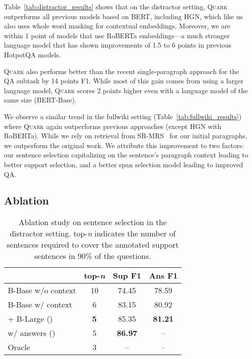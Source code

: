 \documentclass[11pt,a4paper]{article}
\newcommand\model{\textsc{Quark}\xspace}
\newcommand{\hpqa}{HotpotQA\xspace}
\newcommand\T{\rule{0pt}{2.6ex}}       \newcommand\B{\rule[-1.2ex]{0pt}{0pt}} \newcommand\R{\rule{0pt}{2.0ex}}       \newcommand{\selectmod}{\rowcolor{purple!15}}
\begin{document}
Table~\ref{tab:distractor_results} shows that on the distractor setting, \model outperforms all previous models based on BERT, including HGN, which like us also uses whole word masking for contextual embeddings. Moreover, we are within 1 point of models that use RoBERTa embeddings---a much stronger language model that has shown improvements of 1.5 to 6 points in previous \hpqa models.

\model also performs better than the recent single-paragraph approach for the QA subtask \cite{Min2019CompositionalQD} by 14 points F1. While most of this gain comes from using a larger language model, \model scores 2 points higher even with a language model of the same size (BERT-Base).

We observe a similar trend in the fullwiki setting (Table~\ref{tab:fullwiki_results}) where \model again outperforms previous approaches (except HGN with RoBERTa). While we rely on retrieval from SR-MRS~\cite{semanticmrs} for our initial paragraphs, we outperform the original work.
We attribute this improvement to two factors: our sentence selection capitalizing on the sentence's paragraph context leading to better support selection, and a better span selection model leading to improved QA.


\subsection{Ablation}

\begin{table}[t]
    \centering
    \small
    \setlength{\doublerulesep}{\arrayrulewidth}
    \begin{tabular}{l|c|c|c}
    \hline \hline
    \T                            & top-\emph{n} & Sup F1 & Ans F1 \\
    \hline
    \T B-Base w/o context         & 10 &  74.45 &  78.59 \\
    B-Base w/ context             &  6 &  83.15 &  80.92 \\
    + B-Large ()       & \textbf{5} & 85.35 & \textbf{81.21} \\
    \hline
    \T w/ answers ()      &  5 & \textbf{86.97} & -- \\
    Oracle                        &  3 & -- & -- \\
    \hline \hline
    \end{tabular}
    \caption{Ablation study on sentence selection in the distractor setting. top-\emph{n} indicates the number of sentences required to cover the annotated support sentences in 90\% of the questions.}
    \label{tab:sentence_selection}
\end{table}
\end{document}
